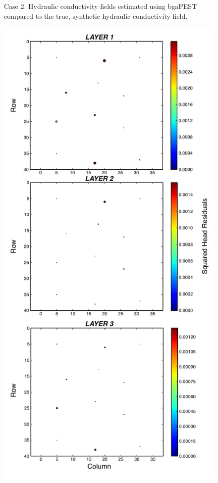 \documentclass[11pt,oneside,onecolumn]{usgsreport}
\begin{document}
\begin{appendix}
\begin{figure}[!t]
\caption{\label{fig:3LK_case2}Case 2: Hydraulic conductivity fields estimated
using bgaPEST compared to the true, synthetic hydraulic conductivity
field.}
\end{figure}


\begin{figure}[!t]
\begin{center}\includegraphics[scale=0.5]{figures/3L_resid_case2}\end{center}


\end{figure}
\end{appendix}
\end{document}
